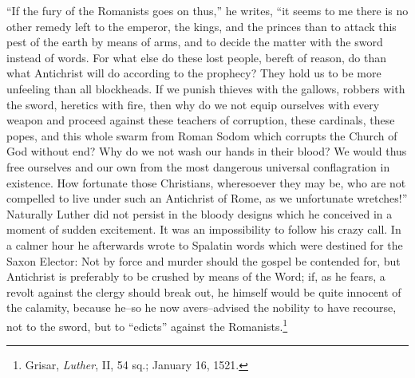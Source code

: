 “If the fury of the Romanists goes on thus,” he writes, “it seems to me
there is no other remedy left to the emperor, the kings, and the princes than
to attack this pest of the earth by means of arms, and to decide the matter
with the sword instead of words. For what else do these lost people, bereft
of reason, do than what Antichrist will do according to the prophecy? They
hold us to be more unfeeling than all blockheads. If we punish thieves with
the gallows, robbers with the sword, heretics with fire, then why do we not
equip ourselves with every weapon and proceed against these teachers of corruption,
these cardinals, these popes, and this whole swarm from Roman
Sodom which corrupts the Church of God without end? Why do we not
wash our hands in their blood? We would thus free ourselves and our own
from the most dangerous universal conflagration in existence. How fortunate
those Christians, wheresoever they may be, who are not compelled to live
under such an Antichrist of Rome, as we unfortunate wretches!”
Naturally Luther did not persist in the bloody designs which he
conceived in a moment of sudden excitement. It was an impossibility
to follow his crazy call. In a calmer hour he afterwards wrote to
Spalatin words which were destined for the Saxon Elector: Not by
force and murder should the gospel be contended for, but Antichrist
is preferably to be crushed by means of the Word; if, as he fears,
a revolt against the clergy should break out, he himself would be
quite innocent of the calamity, because he--so he now avers--advised
the nobility to have recourse, not to the sword, but to “edicts”
against the Romanists.\footnote{Grisar, \textit{Luther}, II, 54 sq.; January 16, 1521.}

